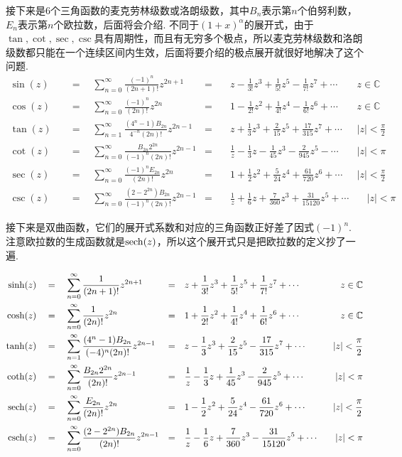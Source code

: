接下来是6个三角函数的麦克劳林级数或洛朗级数，其中\(B_n\)表示第\(n\)个伯努利数，\(E_n\)表示第\(n\)个欧拉数，后面将会介绍. 不同于\((1+x)^{\alpha}\)的展开式，由于\(\tan,\cot,\sec,\csc\)具有周期性，而且有无穷多个极点，所以麦克劳林级数和洛朗级数都只能在一个连续区间内生效，后面将要介绍的极点展开就很好地解决了这个问题.
\begin{align*}
    \sin(z)\quad&=\quad \sum_{n=0}^{\infty}\frac{(-1)^n}{(2n+1)!}z^{2n+1} &=&\quad z-\frac{1}{3!}z^3+\frac{1}{5!}z^5-\frac{1}{7!}z^7+\cdots & z \in \mathbb{C} \\
    \cos(z) \quad&=\quad \sum_{n=0}^{\infty}\frac{(-1)^n}{(2n)!}z^{2n} &=&\quad 1-\frac{1}{2!}z^2+\frac{1}{4!}z^4-\frac{1}{6!}z^6+\cdots & z \in \mathbb{C} \\
    \tan(z) \quad&=\quad \sum_{n=1}^{\infty}\frac{(4^{n}-1)B_{2n}}{4^{-n}(2n)!}z^{2n-1} &=&\quad z + \frac{1}{3}z^3 + \frac{2}{15}z^5 + \frac{17}{315}z^7+\cdots & |z|<\frac {\pi}{2} \\
    \cot(z) \quad&=\quad \sum_{n=0}^{\infty}\frac{B_{2n}2^{2n}}{(-1)^n(2n)!}z^{2n-1} &=&\quad \frac{1}{z}-\frac{1}{3}z-\frac{1}{45}z^3-\frac{2}{945}z^5-\cdots & |z|<{\pi} \\
    \sec(z) \quad&=\quad \sum_{n=0}^{\infty}\frac{(-1)^nE_{2n}}{(2n)!}z^{2n} &=&\quad 1+\frac{1}{2}z^2+\frac{5}{24}z^4+\frac{61}{720}z^6+\cdots & |z|<\frac{\pi}{2} \\
    \csc(z) \quad&=\quad \sum_{n=0}^{\infty}\frac{(2-2^{2n})B_{2n}}{(-1)^{n}(2n)!}z^{2n-1} &=&\quad \frac{1}{z} + \frac{1}{6}z + \frac{7}{360}z^3 + \frac{31}{15120}z^5 +\cdots & \quad |z|<\pi
\end{align*}

接下来是双曲函数，它们的展开式系数和对应的三角函数正好差了因式\((-1)^n\). 注意欧拉数的生成函数就是\({\rm sech}(z)\)，所以这个展开式只是把欧拉数的定义抄了一遍.

\begin{align*}
    \sinh(z) \quad&=\quad \sum_{n=0}^{\infty}\frac{1}{(2n+1)!}z^{2n+1} &=&\quad z+\frac{1}{3!}z^3+\frac{1}{5!}z^5+\frac{1}{7!}z^7+\cdots & z \in \mathbb{C} \\
    \cosh(z) \quad&=\quad \sum_{n=0}^{\infty}\frac{1}{(2n)!}z^{2n} &=&\quad 1+\frac{1}{2!}z^2+\frac{1}{4!}z^4+\frac{1}{6!}z^6+\cdots & z \in \mathbb{C} \\
    \tanh(z) \quad&=\quad \sum_{n=1}^{\infty}\frac{(4^{n}-1)B_{2n}}{(-4)^n(2n)!}z^{2n-1} &=&\quad z - \frac{1}{3}z^3 + \frac{2}{15}z^5 - \frac{17}{315}z^7+\cdots & |z|<\frac {\pi}{2} \\
    {\rm coth}(z) \quad&=\quad \sum_{n=0}^{\infty}\frac{B_{2n}2^{2n}}{(2n)!}z^{2n-1} &=&\quad \frac{1}{z}-\frac{1}{3}z+\frac{1}{45}z^3-\frac{2}{945}z^5+\cdots & |z|<{\pi} \\
    {\rm sech}(z) \quad&=\quad \sum_{n=0}^{\infty}\frac{E_{2n}}{(2n)!}z^{2n} &=&\quad 1-\frac{1}{2}z^2+\frac{5}{24}z^4-\frac{61}{720}z^6+\cdots & |z|<\frac{\pi}{2} \\
    {\rm csch}(z) \quad&=\quad \sum_{n=0}^{\infty}\frac{(2-2^{2n})B_{2n}}{(2n)!}z^{2n-1} &=&\quad \frac{1}{z} - \frac{1}{6}z + \frac{7}{360}z^3 - \frac{31}{15120}z^5 +\cdots & \quad |z|<\pi
\end{align*}

